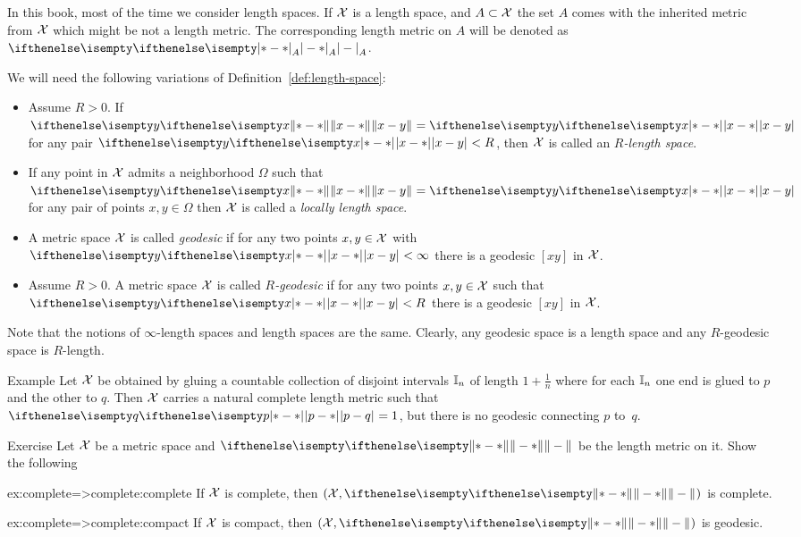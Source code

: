 In this book, most of the time we consider length spaces.
If $\mathcal{X}$ is a length space, 
and $A\subset \spc{X}$ the set $A$ comes with the inherited metric from $\mathcal{X}$ 
which might be not a length metric.
The corresponding length metric on $A$ will be denoted as $\dist{}{}{A}$.


We will need the following variations of Definition~\ref{def:length-space}:

\begin{itemize}
\item Assume $R>0$.
If $\yetdist{x}{y}{}=\dist{x}{y}{}$ for any pair $\dist{x}{y}{}<R$, then $\mathcal{X}$ is called an \emph{$R$-length space}.
\item If any point in $\mathcal{X}$ admits a neighborhood  $\Omega$ such that $\yetdist{x}{y}{}=\dist{x}{y}{}$ for any pair of points $x,y\in \Omega$
then  $\mathcal{X}$ is called a \emph{locally length space}.
\item A metric space $\mathcal{X}$ is called 
\emph{geodesic}%
if for any two points $x,y\in \spc{X}$ with $\dist{x}{y}{}<\infty$ there is a geodesic $[x y]$ in $\mathcal{X}$.
\item Assume $R>0$. A metric space $\mathcal{X}$ is called 
\emph{$R$-geodesic}%
if for any two points $x,y\in \spc{X}$ such that $\dist{x}{y}{}<R$ there is a geodesic $[x y]$ in $\mathcal{X}$.
\end{itemize}

Note that the notions of $\infty$-length spaces and length spaces are the same.
Clearly, any geodesic space is a length space 
and any $R$-geodesic space is $R$-length.

\begin{thm}{Example} 
Let $\mathcal{X}$ be obtained by gluing a countable collection of disjoint intervals $\mathbb{I}_n$ of length $1+\tfrac1n$ where for each $\mathbb{I}_n$ one end is glued to $p$ and the other to $q$.
Then $\mathcal{X}$ carries a natural complete length metric such that $\dist{p}{q}{}=1$, but there is no geodesic connecting $p$ to~$q$.
\end{thm}

\begin{thm}{Exercise}\label{ex:complete=>complete}
Let $\mathcal{X}$ be a metric space
and $\yetdist{}{}{}$ be the length metric on it.
Show the following
\begin{subthm}{ex:complete=>complete:complete}
If $\mathcal{X}$  is complete, then  $(\spc{X},\yetdist{}{}{})$ is complete.
\end{subthm}

\begin{subthm}{ex:complete=>complete:compact}
If $\mathcal{X}$ is compact, then $(\spc{X},\yetdist{}{}{})$ is geodesic.
\end{subthm}
\end{thm}


